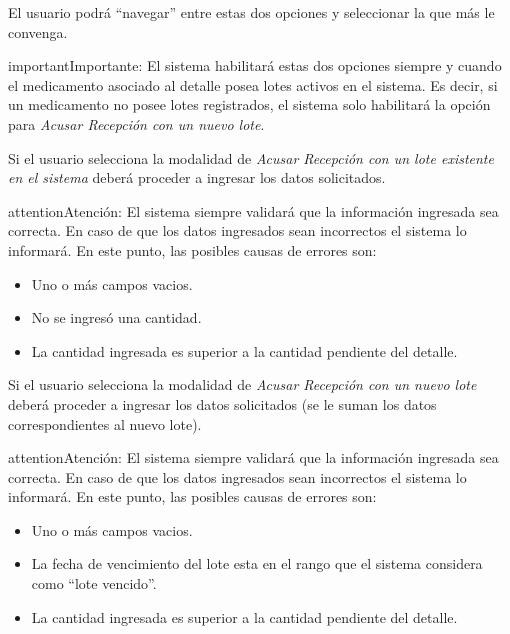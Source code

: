 \documentclass[a4paper,10pt,spanish]{sphinxmanual}
\begin{document}
El usuario podrá ``navegar'' entre estas dos opciones y seleccionar la que más le convenga.


\begin{notice}{important}{Importante:}
El sistema habilitará estas dos opciones siempre y cuando el medicamento asociado al detalle posea lotes activos en el sistema. Es decir, si un medicamento no posee lotes registrados, el sistema solo habilitará la opción para \emph{Acusar Recepción con un nuevo lote}.
\end{notice}

Si el usuario selecciona la modalidad de \emph{Acusar Recepción con un lote existente en el sistema} deberá proceder a ingresar los datos solicitados.

\begin{notice}{attention}{Atención:}
El sistema siempre validará que la información ingresada sea correcta. En caso de que los datos ingresados sean incorrectos el sistema lo informará.
En este punto, las posibles causas de errores son:
\begin{itemize}
\item {} 
Uno o más campos vacios.

\item {} 
No se ingresó una cantidad.

\item {} 
La cantidad ingresada es superior a la cantidad pendiente del detalle.

\end{itemize}
\end{notice}

Si el usuario selecciona la modalidad de \emph{Acusar Recepción con un nuevo lote} deberá proceder a ingresar los datos solicitados (se le suman los datos correspondientes al nuevo lote).

\begin{notice}{attention}{Atención:}
El sistema siempre validará que la información ingresada sea correcta. En caso de que los datos ingresados sean incorrectos el sistema lo informará.
En este punto, las posibles causas de errores son:
\begin{itemize}
\item {} 
Uno o más campos vacios.

\item {} 
La fecha de vencimiento del lote esta en el rango que el sistema considera como ``lote vencido''.

\item {} 
La cantidad ingresada es superior a la cantidad pendiente del detalle.

\end{itemize}
\end{notice}
\end{document}
